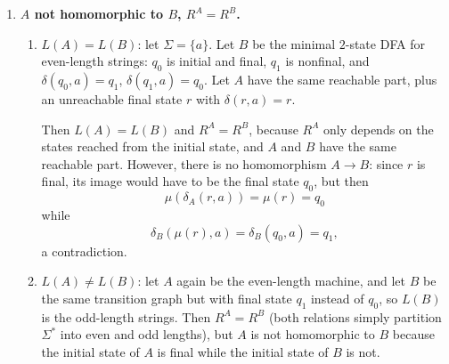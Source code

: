 \begin{enumerate}[{3.}1.]
\begin{enumerate}
Now let $xR^B y$. Since $\mu^{-1}:B\to A$ is also an isomorphism, the inclusion
proved above with $A$ and $B$ interchanged gives $xR^A y$. Hence
$R^B\subseteq R^A$. Therefore
$R^A=R^B$.

\item Equivalently, for every word $x$,
\[
\mu(\DBAR_A(s_{0_A},x))=\DBAR_B(s_{0_B},x),
\]
and this can be proved by induction on $|x|$. The base case $x=\lambda$ is
\[
\mu(\DBAR_A(s_{0_A},\lambda))=\mu(s_{0_A})=s_{0_B}=\DBAR_B(s_{0_B},\lambda).
\]
For the step, write $x=\mathbf{a}w$. Then
\[
\mu(\DBAR_A(s_{0_A},\mathbf{a}w))
=\mu(\DBAR_A(\delta_A(s_{0_A},\mathbf{a}),w))
=\DBAR_B(\mu(\delta_A(s_{0_A},\mathbf{a})),w),
\]
by the induction hypothesis, and since $\mu$ preserves transitions this equals
\[
\DBAR_B(\delta_B(s_{0_B},\mathbf{a}),w)=\DBAR_B(s_{0_B},\mathbf{a}w).
\]
Because $\mu$ is injective,
\[
\DBAR_A(s_{0_A},x)=\DBAR_A(s_{0_A},y)
\Leftrightarrow
\DBAR_B(s_{0_B},x)=\DBAR_B(s_{0_B},y),
\]
so again $R^A=R^B$.
\end{enumerate}

\item \textbf{$A$ not homomorphic to $B$, $R^A=R^B$.}

\begin{enumerate}
\item $L(A)=L(B)$: let $\Sigma=\{a\}$. Let $B$ be the minimal $2$-state DFA for
even-length strings: $q_0$ is initial and final, $q_1$ is nonfinal, and
$\delta(q_0,a)=q_1$, $\delta(q_1,a)=q_0$. Let $A$ have the same reachable part,
plus an unreachable final state $r$ with $\delta(r,a)=r$.

Then $L(A)=L(B)$ and $R^A=R^B$, because $R^A$ only depends on the states reached
from the initial state, and $A$ and $B$ have the same reachable part. However,
there is no homomorphism $A\to B$: since $r$ is final, its image would have to
be the final state $q_0$, but then
\[
\mu(\delta_A(r,a))=\mu(r)=q_0
\]
while
\[
\delta_B(\mu(r),a)=\delta_B(q_0,a)=q_1,
\]
a contradiction.

\item $L(A)\neq L(B)$: let $A$ again be the even-length machine, and let $B$ be
the same transition graph but with final state $q_1$ instead of $q_0$, so
$L(B)$ is the odd-length strings. Then $R^A=R^B$ (both relations simply
partition $\Sigma^*$ into even and odd lengths), but $A$ is not homomorphic to
$B$ because the initial state of $A$ is final while the initial state of $B$ is
not.


\end{enumerate}
\end{enumerate}
